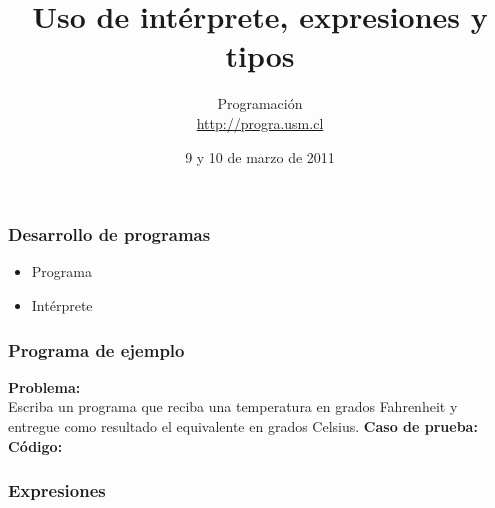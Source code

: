 \documentclass[12pt]{beamer}
\title{Uso de intérprete, expresiones y tipos}
\author{
  Programación \\ \url{http://progra.usm.cl}
}
\date{9 y 10 de marzo de 2011}
\begin{document}
  \begin{frame}
    \maketitle
  \end{frame}

  \begin{frame}
    \frametitle{Desarrollo de programas}\label{conceptos}
    \begin{itemize}
      \item Programa
      \item Intérprete
    \end{itemize}
  \end{frame}

  \begin{frame}
    \frametitle{Programa de ejemplo}\label{prog-ejemplo}
    \textbf{Problema:}\\
    Escriba un programa que reciba una temperatura en grados Fahrenheit
    y entregue como resultado el equivalente en grados Celsius.
    \vfill
    \textbf{Caso de prueba:}\\
    
    \vfill
    \textbf{Código:}\\
    
  \end{frame}

  \begin{frame}
    \frametitle{Expresiones}\label{ejemplos-expresiones}

    

  \end{frame}
\end{document}
